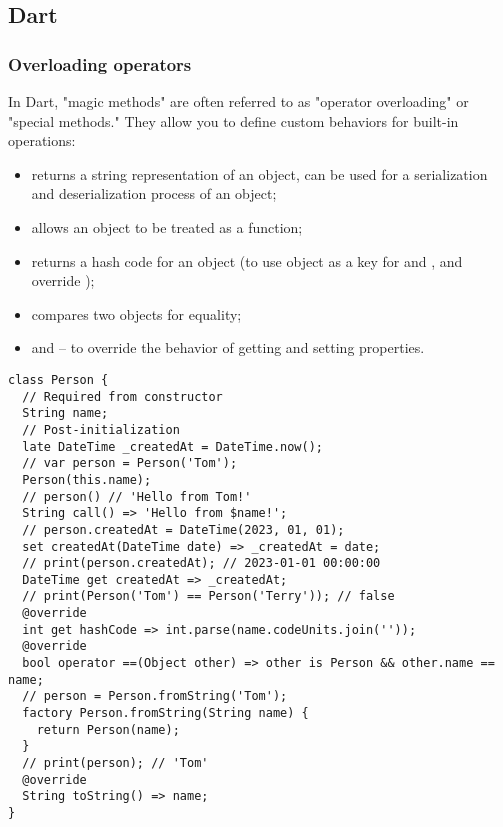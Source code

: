 
\subsection{Dart}

\subsubsection{Overloading operators}

In Dart, "magic methods" are often referred to as "operator overloading" or "special methods." They allow you to define 
custom behaviors for built-in operations:

\begin{itemize}
  \item {} returns a string representation of an object, can be used for a serialization and deserialization 
  process of an object;
  \item {} allows an object to be treated as a function;
  \item {} returns a hash code for an object (to use object as a key for  and , and override \q{==});
  \item {} compares two objects for equality;
  \item {} and  -- to override the behavior of getting and setting properties.
\end{itemize}

\begin{lstlisting}
class Person {
  // Required from constructor
  String name;
  // Post-initialization
  late DateTime _createdAt = DateTime.now();
  // var person = Person('Tom');
  Person(this.name);
  // person() // 'Hello from Tom!'
  String call() => 'Hello from $name!';
  // person.createdAt = DateTime(2023, 01, 01);
  set createdAt(DateTime date) => _createdAt = date;
  // print(person.createdAt); // 2023-01-01 00:00:00
  DateTime get createdAt => _createdAt;
  // print(Person('Tom') == Person('Terry')); // false
  @override
  int get hashCode => int.parse(name.codeUnits.join(''));
  @override
  bool operator ==(Object other) => other is Person && other.name == name;
  // person = Person.fromString('Tom');
  factory Person.fromString(String name) {
    return Person(name);
  }
  // print(person); // 'Tom'
  @override
  String toString() => name;
}
\end{lstlisting}
